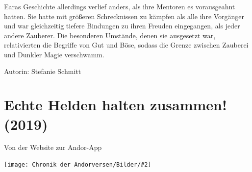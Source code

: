 \documentclass[10pt, a4paper, oneside]{book}
\newcommand{\storytext}[1]{%
    \section{#1}%
    \label{Storytext: #1}%
}
\newcommand{\bildmitts}[2][height=0.32\textwidth,width=0.48\textwidth,keepaspectratio]{%
    \begin{center}
        \texttt{[image: Chronik der Andorversen/Bilder/\#2]}
    \end{center}
}
\begin{document}
\begin{multicols}{2}
Earas Geschichte allerdings verlief anders, als ihre Mentoren es vorausgeahnt hatten. Sie hatte mit größeren Schrecknissen zu kämpfen als alle ihre Vorgänger und war gleichzeitig tiefere Bindungen zu ihren Freuden eingegangen, als jeder andere Zauberer. Die besonderen Umstände, denen sie ausgesetzt war, relativierten die Begriffe von Gut und Böse, sodass die Grenze zwischen Zauberei und Dunkler Magie verschwamm.\bigskip

Autorin: Stefanie Schmitt


\end{multicols}

\storytext{Echte Helden halten zusammen! (2019)}

\begin{center}
    Von der Website zur Andor-App
\end{center}

\bildmitts[width=0.9\textwidth]{Echte Helden halten zusammen.png}
\newpage
\end{document}

